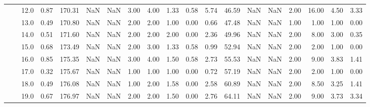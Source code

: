 \begin{tabular}{lllrrrrrrrrrrrrrrrr}
       &     & 12.0 &      0.87 &     170.31 &               NaN &                NaN &  3.00 &   4.00 &             1.33 &                         0.58 &      5.74 &      46.59 &               NaN &                NaN &  2.00 &  16.00 &             4.50 &                         3.33 \\
       &     & 13.0 &      0.49 &     170.80 &               NaN &                NaN &  2.00 &   2.00 &             1.00 &                         0.00 &      0.66 &      47.48 &               NaN &                NaN &  1.00 &   1.00 &             1.00 &                         0.00 \\
       &     & 14.0 &      0.51 &     171.60 &               NaN &                NaN &  2.00 &   2.00 &             2.00 &                         0.00 &      2.36 &      49.96 &               NaN &                NaN &  2.00 &   8.00 &             3.00 &                         0.35 \\
       &     & 15.0 &      0.68 &     173.49 &               NaN &                NaN &  2.00 &   3.00 &             1.33 &                         0.58 &      0.99 &      52.94 &               NaN &                NaN &  2.00 &   2.00 &             1.00 &                         0.00 \\
       &     & 16.0 &      0.85 &     175.35 &               NaN &                NaN &  3.00 &   4.00 &             1.50 &                         0.58 &      2.73 &      55.53 &               NaN &                NaN &  2.00 &   9.00 &             3.83 &                         1.41 \\
       &     & 17.0 &      0.32 &     175.67 &               NaN &                NaN &  1.00 &   1.00 &             1.00 &                         0.00 &      0.72 &      57.19 &               NaN &                NaN &  2.00 &   2.00 &             1.00 &                         0.00 \\
       &     & 18.0 &      0.49 &     176.08 &               NaN &                NaN &  1.00 &   2.00 &             1.58 &                         0.00 &      2.58 &      60.89 &               NaN &                NaN &  2.00 &   8.50 &             3.25 &                         1.41 \\
       &     & 19.0 &      0.67 &     176.97 &               NaN &                NaN &  2.00 &   2.00 &             1.50 &                         0.00 &      2.76 &      64.11 &               NaN &                NaN &  2.00 &   9.00 &             3.73 &                         3.34 \\

\end{tabular}
